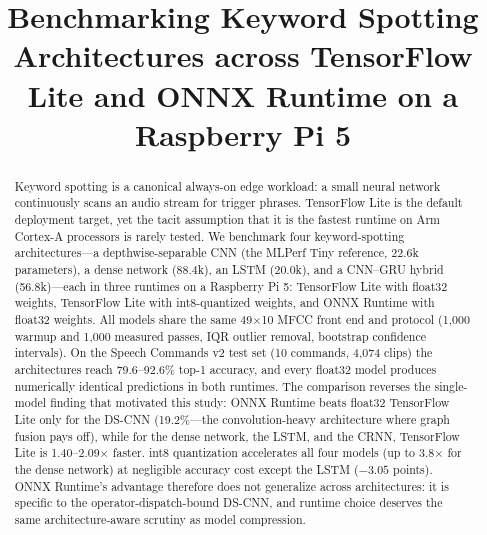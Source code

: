 \documentclass[conference,a4paper]{IEEEtran}
\begin{document}
\title{Benchmarking Keyword Spotting Architectures across TensorFlow Lite and ONNX Runtime on a Raspberry Pi 5}

\author{}

\maketitle

\begin{abstract}
Keyword spotting is a canonical always-on edge workload: a small neural network continuously scans an audio stream for trigger phrases. TensorFlow Lite is the default deployment target, yet the tacit assumption that it is the fastest runtime on Arm Cortex-A processors is rarely tested. We benchmark four keyword-spotting architectures---a depthwise-separable CNN (the MLPerf Tiny reference, 22.6k parameters), a dense network (88.4k), an LSTM (20.0k), and a CNN--GRU hybrid (56.8k)---each in three runtimes on a Raspberry Pi 5: TensorFlow Lite with float32 weights, TensorFlow Lite with int8-quantized weights, and ONNX Runtime with float32 weights. All models share the same 49$\times$10 MFCC front end and protocol (1{,}000 warmup and 1{,}000 measured passes, IQR outlier removal, bootstrap confidence intervals). On the Speech Commands v2 test set (10 commands, 4{,}074 clips) the architectures reach 79.6--92.6\% top-1 accuracy, and every float32 model produces numerically identical predictions in both runtimes. The comparison reverses the single-model finding that motivated this study: ONNX Runtime beats float32 TensorFlow Lite only for the DS-CNN (19.2\%---the convolution-heavy architecture where graph fusion pays off), while for the dense network, the LSTM, and the CRNN, TensorFlow Lite is 1.40--2.09$\times$ faster. int8 quantization accelerates all four models (up to 3.8$\times$ for the dense network) at negligible accuracy cost except the LSTM ($-3.05$ points). ONNX Runtime's advantage therefore does not generalize across architectures: it is specific to the operator-dispatch-bound DS-CNN, and runtime choice deserves the same architecture-aware scrutiny as model compression.
\end{abstract}
\end{document}
